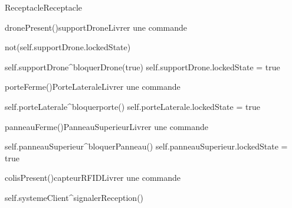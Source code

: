 \begin{OM}{Receptacle}{Receptacle}
    \begin{OMOperation}{dronePresent()}{supportDrone}{Livrer une commande}
        \begin{OMMessages}
        \end{OMMessages}
        \begin{OMPre}
not(self.supportDrone.lockedState)
        \end{OMPre}
        \begin{OMPost}
self.supportDrone^bloquerDrone(true)
self.supportDrone.lockedState = true
        \end{OMPost}
    \end{OMOperation}

    \begin{OMOperation}{porteFerme()}{PorteLaterale}{Livrer une commande}
        \begin{OMMessages}
        \end{OMMessages}
        \OMNoPre
        \begin{OMPost}
self.porteLaterale^bloquerporte()
self.porteLaterale.lockedState = true
        \end{OMPost}
    \end{OMOperation}

    \begin{OMOperation}{panneauFerme()}{PanneauSuperieur}{Livrer une commande}
        \begin{OMMessages}
        \end{OMMessages}
        \OMNoPre
        \begin{OMPost}
self.panneauSuperieur^bloquerPanneau()
self.panneauSuperieur.lockedState = true
        \end{OMPost}
    \end{OMOperation}

    \begin{OMOperation}{colisPresent()}{capteurRFID}{Livrer une commande}
        \begin{OMMessages}
        \end{OMMessages}
        \OMNoPre
        \begin{OMPost}
self.systemeClient^signalerReception()
        \end{OMPost}
    \end{OMOperation}
\end{OM}

